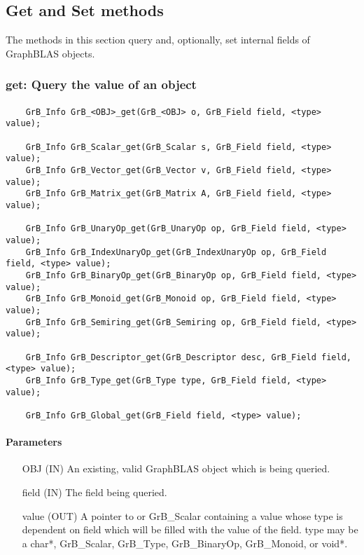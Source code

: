 \subsection{Get and Set methods}

The methods in this section query and, optionally, 
set internal fields of GraphBLAS objects.

\subsubsection{{\sf get}: Query the value of an object}

\paragraph{\syntax}

\begin{verbatim}
    GrB_Info GrB_<OBJ>_get(GrB_<OBJ> o, GrB_Field field, <type> value);

    GrB_Info GrB_Scalar_get(GrB_Scalar s, GrB_Field field, <type> value);
    GrB_Info GrB_Vector_get(GrB_Vector v, GrB_Field field, <type> value);
    GrB_Info GrB_Matrix_get(GrB_Matrix A, GrB_Field field, <type> value);

    GrB_Info GrB_UnaryOp_get(GrB_UnaryOp op, GrB_Field field, <type> value);
    GrB_Info GrB_IndexUnaryOp_get(GrB_IndexUnaryOp op, GrB_Field field, <type> value);
    GrB_Info GrB_BinaryOp_get(GrB_BinaryOp op, GrB_Field field, <type> value);
    GrB_Info GrB_Monoid_get(GrB_Monoid op, GrB_Field field, <type> value);
    GrB_Info GrB_Semiring_get(GrB_Semiring op, GrB_Field field, <type> value);

    GrB_Info GrB_Descriptor_get(GrB_Descriptor desc, GrB_Field field, <type> value);
    GrB_Info GrB_Type_get(GrB_Type type, GrB_Field field, <type> value);

    GrB_Info GrB_Global_get(GrB_Field field, <type> value);
\end{verbatim}

\paragraph{Parameters}

\begin{itemize}[leftmargin=1.1in]
    \item[{\sf OBJ}] ({\sf IN}) An existing, valid GraphBLAS object which is being queried.
    \item[{\sf field}] ({\sf IN}) The field being queried.
    \item[{\sf value}] ({\sf OUT}) A pointer to or {\sf GrB\_Scalar} containing a value whose type is dependent on {\sf field} which will be
                                 filled with the value of the field. {\sf type} may be a {\sf char*},
                                 {\sf GrB\_Scalar}, {\sf GrB\_Type}, {\sf GrB\_BinaryOp}, {\sf GrB\_Monoid}, or {\sf void*}.
\end{itemize}

